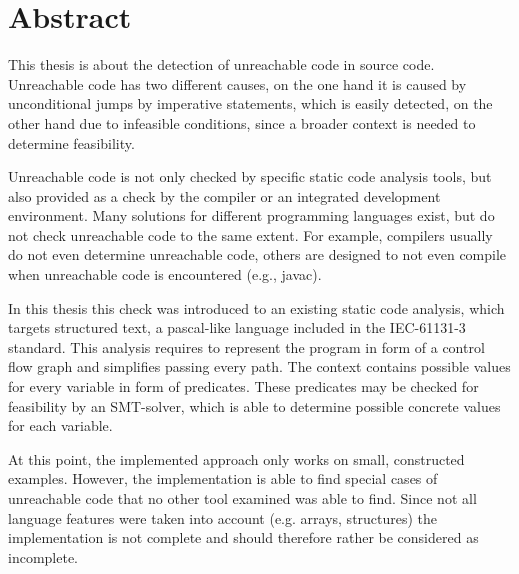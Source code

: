 \chapter{Abstract}
\label{cha:abstract}


This thesis is about the detection of unreachable code in source code. %
Unreachable code has two different causes, on the one hand it is caused by unconditional jumps by imperative statements, which is easily detected, on the other hand due to infeasible conditions, since a broader context is needed to determine feasibility.

Unreachable code is not only checked by specific static code analysis tools,  but also provided as a check by the compiler or an integrated development environment. Many solutions for different programming languages exist, but do not check unreachable code to the same extent. For example, compilers usually do not even determine unreachable code, others are designed to not even compile when unreachable code is encountered (e.g., javac).


In this thesis this check was introduced to an existing static code analysis, which targets structured text, a pascal-like language included in the IEC-61131-3 standard. This analysis requires to represent the program in form of a control flow graph and simplifies passing every path. The context contains possible values for every variable in form of predicates. These predicates may be checked for feasibility by an SMT-solver, which is able to determine possible concrete values for each variable. 

At this point, the implemented approach only works on small, constructed examples. However, the implementation is able to find special cases of unreachable code that no other tool examined was able to find. Since not all language features were taken into account (e.g. arrays, structures) the implementation is not complete and should therefore rather be considered as incomplete.

